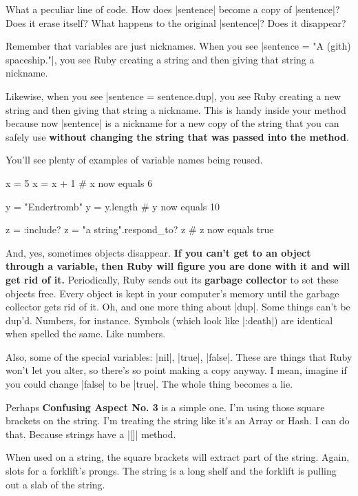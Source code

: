 \documentclass[12pt,twoside]{report}
\begin{document}
What a peculiar line of code.  How does
\rubyinline|sentence| become a copy of
\rubyinline|sentence|? Does it erase itself?  What
happens to the original \rubyinline|sentence|?  Does
it disappear?

Remember that variables are just nicknames.  When you see
\rubyinline|sentence = "A (gith) spaceship."|, you see
Ruby creating a string and then giving that string a nickname.

Likewise, when you see \rubyinline|sentence = sentence.dup|, 
you see Ruby creating a new string and then giving that
string a nickname.  This is handy inside your method because now
\rubyinline|sentence| is a nickname for a new copy of
the string that you can safely use {\bf without changing the string
  that was passed into the method}.

You'll see plenty of examples of variable names being reused.


\begin{rubycode}

 x = 5
 x = x + 1
 # x now equals 6

 y = "Endertromb"
 y = y.length
 # y now equals 10

 z = :include?
 z = "a string".respond_to? z
 # z now equals true

\end{rubycode}


And, yes, sometimes objects disappear.  {\bf If you can't get to an
  object through a variable, then Ruby will figure you are done with
  it and will get rid of it.}  Periodically, Ruby sends out its {\bf
  garbage collector} to set these objects free.  Every object is kept
in your computer's memory until the garbage collector gets rid of it.
Oh, and one more thing about \rubyinline|dup|.  Some
things can't be dup'd.  Numbers, for instance.  Symbols (which look
like \rubyinline|:death|) are identical when spelled
the same.  Like numbers.

Also, some of the special variables: \rubyinline|nil|,
\rubyinline|true|, \rubyinline|false|.
These are things that Ruby won't let you alter, so there's so point
making a copy anyway.  I mean, imagine if you could change
\rubyinline|false| to be
\rubyinline|true|.  The whole thing becomes a lie.

Perhaps {\bf Confusing Aspect No. 3} is a simple one.  I'm using those
square brackets on the string.  I'm treating the string like it's an
Array or Hash.  I can do that.  Because strings have a
\rubyinline|[]| method.

When used on a string, the square brackets will extract part of the
string.  Again, slots for a forklift's prongs.  The string is a long
shelf and the forklift is pulling out a slab of the string.
\end{document}
